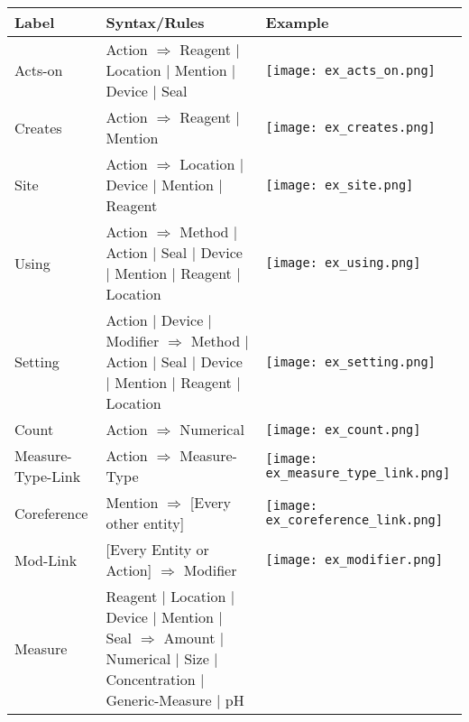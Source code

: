 \documentclass[11pt,a4paper]{article}
\begin{document}
\begin{table*}[]
\centering
\begin{tabular}{|m{1.8cm}|m{7.9cm}|m{5cm}|}
    \hline
    Label & Syntax/Rules & Example \\
    \hline
    Acts-on & Action $\Rightarrow$ Reagent $\vert$ Location $\vert$ Mention $\vert$ Device $\vert$ Seal & \vspace{0.12cm}\texttt{[image: ex\_acts\_on.png]}\\
    \hline
    Creates & Action $\Rightarrow$ Reagent $\vert$ Mention & \vspace{0.12cm}\texttt{[image: ex\_creates.png]} \\
    \hline
    Site & Action $\Rightarrow$ Location $\vert$ Device $\vert$ Mention $\vert$ Reagent
    & \vspace{0.12cm}\texttt{[image: ex\_site.png]} \\
    \hline 
    Using & Action $\Rightarrow$ Method $\vert$ Action $\vert$ Seal $\vert$ Device $\vert$ Mention $\vert$ Reagent $\vert$ Location
    & \vspace{0.12cm}\texttt{[image: ex\_using.png]}\\
    \hline
    Setting & Action $\vert$ Device $\vert$ Modifier $\Rightarrow$ Method $\vert$ Action $\vert$ Seal $\vert$ Device $\vert$ Mention $\vert$ Reagent $\vert$ Location
    & \vspace{0.12cm}\texttt{[image: ex\_setting.png]} \\
    \hline
    Count & Action $\Rightarrow$ Numerical 
    & \vspace{0.12cm}\texttt{[image: ex\_count.png]} \\
    \hline
    Measure-Type-Link & Action $\Rightarrow$ Measure-Type 
    & \vspace{0.12cm}\texttt{[image: ex\_measure\_type\_link.png]} \\
    \hline
    Coreference & Mention $\Rightarrow$ [Every other entity]
    & \vspace{0.12cm}\texttt{[image: ex\_coreference\_link.png]} \\
    \hline
    Mod-Link & [Every Entity or Action] $\Rightarrow$ Modifier
    & \vspace{0.12cm}\texttt{[image: ex\_modifier.png]} \\
    \hline
    Measure & Reagent $\vert$ Location $\vert$ Device $\vert$ Mention $\vert$ Seal $\Rightarrow$ Amount $\vert$ Numerical $\vert$ Size $\vert$ Concentration $\vert$ Generic-Measure $\vert$ pH

\end{tabular}
\end{table*}
\end{document}
